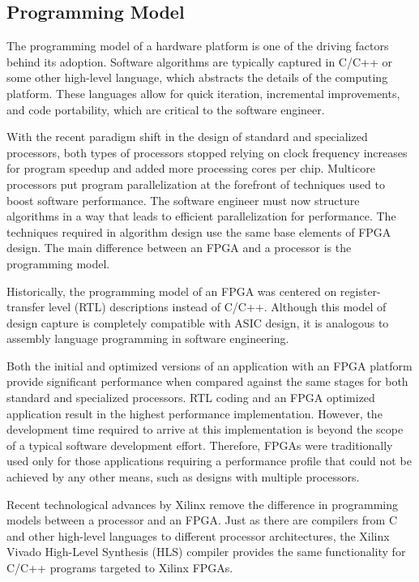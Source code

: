 \clearpage
\subsection{Programming Model}

The programming model of a hardware platform is one of the driving factors behind its adoption. Software algorithms are typically captured in C/C++ or some other high-level
language, which abstracts the details of the computing platform. These languages allow for
quick iteration, incremental improvements, and code portability, which are critical to the
software engineer.

\par With the recent paradigm shift in the design of standard and specialized processors, both
types of processors stopped relying on clock frequency increases for program speedup and
added more processing cores per chip. Multicore processors put program parallelization at
the forefront of techniques used to boost software performance. The software engineer
must now structure algorithms in a way that leads to efficient parallelization for
performance. The techniques required in algorithm design use the same base elements of
FPGA design. The main difference between an FPGA and a processor is the programming
model.

\par Historically, the programming model of an FPGA was centered on register-transfer level
(RTL) descriptions instead of C/C++. Although this model of design capture is completely
compatible with ASIC design, it is analogous to assembly language programming in
software engineering. 

\par Both the initial and optimized versions of an application with an
FPGA platform provide significant performance when compared against the same 
stages for both standard and specialized
processors. RTL coding and an FPGA optimized application result in the highest
performance implementation. However, the development time required to arrive at this implementation is beyond the
scope of a typical software development effort. Therefore, FPGAs were traditionally used
only for those applications requiring a performance profile that could not be achieved by
any other means, such as designs with multiple processors.

\par Recent technological advances by Xilinx remove the difference in programming models
between a processor and an FPGA. Just as there are compilers from C and other high-level
languages to different processor architectures, the Xilinx Vivado High-Level Synthesis
(HLS) compiler provides the same functionality for C/C++ programs targeted to Xilinx
FPGAs.

